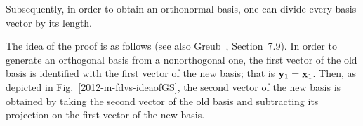 Subsequently, in order to obtain an orthonormal basis,
one can divide every basis vector by its length.

{\color{OliveGreen}
\bproof
The idea of the proof is as follows (see also Greub~\cite{Greub75}, Section~7.9).
In order to generate an orthogonal basis from a nonorthogonal one,
the first vector of the old basis is identified with the first vector of the new basis;
that is ${\bf y}_1={\bf x}_1$.
Then, as depicted in Fig.~\ref{2012-m-fdvs-ideaofGS}, the second vector of the new basis is obtained by
taking the second vector of the old basis and
subtracting its projection on the first vector of the new basis.
\begin{marginfigure}%
{\color{black}
\begin{center}%
\end{center}}
\end{marginfigure}}
